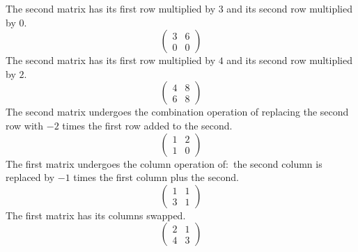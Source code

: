 \begin{exercises}
\begin{exparts*}
    \end{exparts*}
    \begin{answer}
      \begin{exparts}
        \partsitem The second matrix has its first row multiplied 
          by \( 3 \) and
          its second row multiplied by \( 0 \).
          \begin{equation*}
            \begin{pmatrix}
              3  &6  \\
              0  &0
            \end{pmatrix}
          \end{equation*}
        \partsitem The second matrix has its first row multiplied 
          by \( 4 \) and
          its second row multiplied by \( 2 \).
          \begin{equation*}
            \begin{pmatrix}
              4  &8  \\
              6  &8
            \end{pmatrix}
          \end{equation*}
        \partsitem The second matrix undergoes the combination operation
          of replacing the second row with \( -2 \) times the first row added
          to the second.
          \begin{equation*}
            \begin{pmatrix}
              1  &2  \\
              1  &0
            \end{pmatrix}
          \end{equation*}
        \partsitem The first matrix undergoes the column operation of:~the
          second column is replaced by $-1$ times the first column plus the
          second.
          \begin{equation*}
            \begin{pmatrix}
              1  &1  \\
              3  &1
            \end{pmatrix}
          \end{equation*}
        \partsitem The first matrix has its columns swapped.
          \begin{equation*}
            \begin{pmatrix}
              2  &1  \\
              4  &3
            \end{pmatrix}
          \end{equation*}

\end{exparts}
\end{answer}
\end{exercises}
